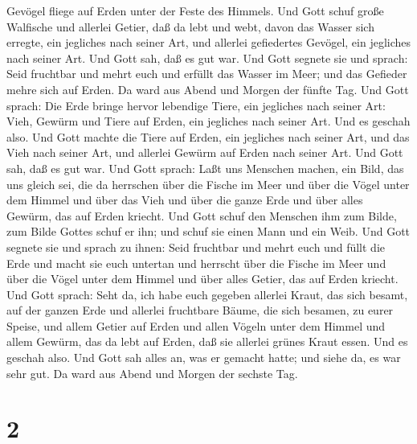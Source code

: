 Gevögel fliege auf Erden unter der Feste des Himmels.  Und
Gott schuf große Walfische und allerlei Getier, daß da lebt und webt,
davon das Wasser sich erregte, ein jegliches nach seiner Art, und
allerlei gefiedertes Gevögel, ein jegliches nach seiner Art. Und Gott
sah, daß es gut war.  Und Gott segnete sie und sprach: Seid
fruchtbar und mehrt euch und erfüllt das Wasser im Meer; und das
Gefieder mehre sich auf Erden.  Da ward aus Abend und
Morgen der fünfte Tag.  Und Gott sprach: Die Erde bringe
hervor lebendige Tiere, ein jegliches nach seiner Art: Vieh, Gewürm und
Tiere auf Erden, ein jegliches nach seiner Art. Und es geschah also.
 Und Gott machte die Tiere auf Erden, ein jegliches nach
seiner Art, und das Vieh nach seiner Art, und allerlei Gewürm auf Erden
nach seiner Art. Und Gott sah, daß es gut war.  Und Gott
sprach: Laßt uns Menschen machen, ein Bild, das uns gleich sei, die da
herrschen über die Fische im Meer und über die Vögel unter dem Himmel
und über das Vieh und über die ganze Erde und über alles Gewürm, das auf
Erden kriecht.  Und Gott schuf den Menschen ihm zum Bilde,
zum Bilde Gottes schuf er ihn; und schuf sie einen Mann und ein Weib.
 Und Gott segnete sie und sprach zu ihnen: Seid fruchtbar
und mehrt euch und füllt die Erde und macht sie euch untertan und
herrscht über die Fische im Meer und über die Vögel unter dem Himmel und
über alles Getier, das auf Erden kriecht.  Und Gott sprach:
Seht da, ich habe euch gegeben allerlei Kraut, das sich besamt, auf der
ganzen Erde und allerlei fruchtbare Bäume, die sich besamen, zu eurer
Speise,  und allem Getier auf Erden und allen Vögeln unter
dem Himmel und allem Gewürm, das da lebt auf Erden, daß sie allerlei
grünes Kraut essen. Und es geschah also.  Und Gott sah
alles an, was er gemacht hatte; und siehe da, es war sehr gut. Da ward
aus Abend und Morgen der sechste Tag.

\hypertarget{section-1}{%
\section{2}\label{section-1}}


